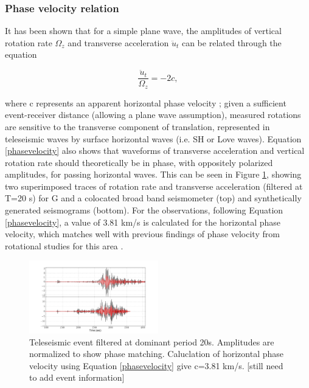 \documentclass{gji}
\begin{document}
\subsubsection{Phase velocity relation}\label{phasevel}
It has been shown that for a simple plane wave, the amplitudes of vertical rotation rate $\Omega_z$  and transverse acceleration $\ddot{u}_t$ can be related through the equation 

\begin{equation}\label{phasevelocity}
	\frac{\ddot{u}_t}{\Omega_z} = -2c,
\end{equation}

\noindent where c represents an apparent horizontal phase velocity \cite{igel2005rotational}; given a sufficient event-receiver distance (allowing a plane wave assumption), measured rotations are sensitive to the transverse component of translation, represented in teleseismic waves by surface horizontal waves (i.e. SH or Love waves). Equation \ref{phasevelocity} also shows that waveforms of transverse acceleration and vertical rotation rate should theoretically be in phase, with oppositely polarized amplitudes, for passing horizontal waves. This can be seen in Figure \ref{fig:rr_ta}, showing two superimposed traces of rotation rate and transverse acceleration (filtered at T=20 s) for G and a colocated broad band seismometer (top) and synthetically generated seismograms (bottom). For the observations, following Equation \ref{phasevelocity}, a value of 3.81 km/s is calculated for the horizontal phase velocity, which matches well with previous findings of phase velocity from rotational studies for this area \cite{igel2007broad}.



\begin{figure}
\centerline{\includegraphics[width=0.5\textwidth]{rr_ta}}
\caption{Teleseismic event filtered at dominant period 20s. Amplitudes are normalized to show phase matching. Caluclation of horizontal phase velocity using Equation \ref{phasevelocity} give c=3.81 km/s. [still need to add event information]}
\label{fig:rr_ta}
\end{figure}
\end{document}
